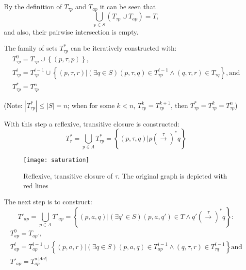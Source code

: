 By the definition of ${T_{\tau p}}$ and ${T_{ap}}$ it can be seen that
\begin{equation*}
 {\bigcup_{p\in S}\left(T_{\tau p}\cup T_{ap}\right)=T},
\end{equation*} 
and also, their pairwise intersection is empty. 

The family of sets ${T^{*}_{\tau p}}$ can be iteratively constructed with:
\begin{equation*}
	\begin{array}{lcl}
		{T^{0}_{\tau p}=T_{\tau p}\cup\left\{\left(p,\tau,p\right)\right\}},\\
		{T^{i}_{\tau p}=T^{i-1}_{\tau p}\cup\left\{\left(p,\tau,r\right)|\left(\exists q\in S\right)\left(p,\tau,q\right)\in T^{i-1}_{\tau p}\wedge\left(q,\tau,r\right)\in T_{\tau q}\right\}}, \text{and} \\
		{T^{*}_{\tau p}=T^{n}_{\tau p}}
	\end{array}
\end{equation*}

(Note: ${\left|T^{*}_{\tau p}\right|\leq\left|S\right|=n}$; when for some ${k<n}$, ${T^{k}_{\tau p}=T^{k+1}_{\tau p}}$, then ${T^{*}_{\tau p}=T^{k}_{\tau p}=T^{n}_{\tau p}}$)

With this step a reflexive, transitive closure is constructed:
\begin{equation*}
	{T^{*}_{\tau}=\bigcup_{p\in A}T^{*}_{\tau p}=\left\{\left(p,\tau,q\right)|p\left(\stackrel{\tau}{\rightarrow}\right)^{*}q\right\}}
\end{equation*}

\begin{figure}[!ht]
\centering
\texttt{[image: saturation]}
\caption{Reflexive, transitive closure of $\tau$. The original graph is depicted with red lines}
\label{fig:saturation}
\end{figure}

The next step is to construct:
\begin{equation}\label{eq:tap}
		T'_{ap}=\bigcup_{p\in A}T'_{ap}=\left\{\left(p,a,q\right)|\left(\exists q'\in S\right)\left(p,a,q'\right)\in T\wedge q'\left(\stackrel{\tau}{\rightarrow}\right)^{*}q\right\}:
\end{equation}
\begin{equation*}
	\begin{array}{lcl}
		T^{0}_{ap}=T_{ap'},\\
		T^{i}_{ap}=T^{i-1}_{ap}\cup \left\{\left(p,a,r\right)|\left(\exists q\in S\right)\left(p,a,q\right)\in T^{i-1}_{ap}\wedge \left(q,\tau,r\right)\in T^{i-1}_{\tau q}\right\} \text{and} \\
		T'_{ap}=T^{n|Act|}_{ap}
	\end{array}
\end{equation*}

